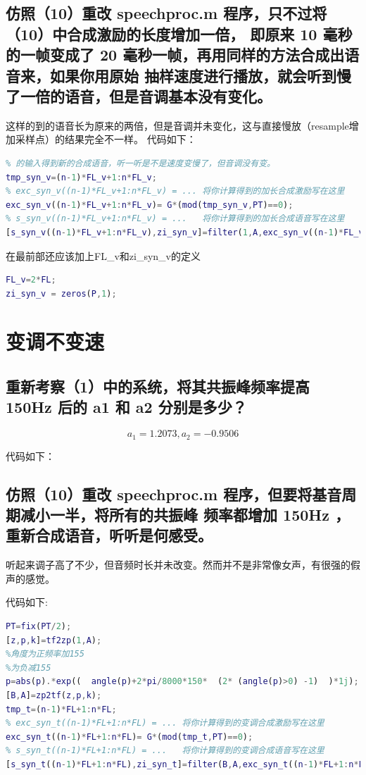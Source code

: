\documentclass{ctexart}
\begin{document}
\subsection{
仿照（10）重改 speechproc.m 程序，只不过将（10）中合成激励的长度增加一倍，
即原来 10 毫秒的一帧变成了 20 毫秒一帧，再用同样的方法合成出语音来，如果你用原始
抽样速度进行播放，就会听到慢了一倍的语音，但是音调基本没有变化。
}    
这样的到的语音长为原来的两倍，但是音调并未变化，这与直接慢放（resample增加采样点）的结果完全不一样。
代码如下：
\begin{lstlisting}[language=matlab]
% (11) 不改变基音周期和预测系数，将合成激励的长度增加一倍，再作为filter
% 的输入得到新的合成语音，听一听是不是速度变慢了，但音调没有变。
tmp_syn_v=(n-1)*FL_v+1:n*FL_v;
% exc_syn_v((n-1)*FL_v+1:n*FL_v) = ... 将你计算得到的加长合成激励写在这里
exc_syn_v((n-1)*FL_v+1:n*FL_v)= G*(mod(tmp_syn_v,PT)==0);
% s_syn_v((n-1)*FL_v+1:n*FL_v) = ...   将你计算得到的加长合成语音写在这里
[s_syn_v((n-1)*FL_v+1:n*FL_v),zi_syn_v]=filter(1,A,exc_syn_v((n-1)*FL_v+1:n*FL_v),zi_syn_v);
\end{lstlisting}

在最前部还应该加上FL\_v和zi\_syn\_v的定义
\begin{lstlisting}[language=matlab]
FL_v=2*FL;
zi_syn_v = zeros(P,1);
\end{lstlisting}
\section{变调不变速}
\setcounter{subsection}{11} 

\subsection{
重新考察（1）中的系统，将其共振峰频率提高 150Hz 后的 a1 和 a2 分别是多少？
}
\[a_1=1.2073,a_2=-0.9506\]

代码如下：


\subsection{
仿照（10）重改 speechproc.m 程序，但要将基音周期减小一半，将所有的共振峰
频率都增加 150Hz ，重新合成语音，听听是何感受。
}
听起来调子高了不少，但音频时长并未改变。然而并不是非常像女声，有很强的假声的感觉。

代码如下:
\begin{lstlisting}[language=matlab]
% (13) 将基音周期减小一半，将共振峰频率增加150Hz，重新合成语音，听听是啥感受～
PT=fix(PT/2);
[z,p,k]=tf2zp(1,A);
%角度为正频率加155
%为负减155
p=abs(p).*exp((  angle(p)+2*pi/8000*150*  (2* (angle(p)>0) -1)  )*1j);
[B,A]=zp2tf(z,p,k);
tmp_t=(n-1)*FL+1:n*FL;
% exc_syn_t((n-1)*FL+1:n*FL) = ... 将你计算得到的变调合成激励写在这里
exc_syn_t((n-1)*FL+1:n*FL)= G*(mod(tmp_t,PT)==0);
% s_syn_t((n-1)*FL+1:n*FL) = ...   将你计算得到的变调合成语音写在这里
[s_syn_t((n-1)*FL+1:n*FL),zi_syn_t]=filter(B,A,exc_syn_t((n-1)*FL+1:n*FL),zi_syn_t);
\end{lstlisting}
\end{document}
